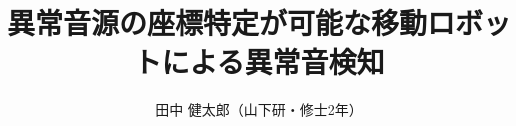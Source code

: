 \documentclass{/workdir/classes/minithesis2024j}
\begin{document}
\title{異常音源の座標特定が可能な移動ロボットによる異常音検知}
\author{田中 健太郎（山下研・修士2年）}

\setlength{\baselineskip}{4.4mm}

\maketitle

\thispagestyle{empty}
\pagestyle{empty}









\end{document}
